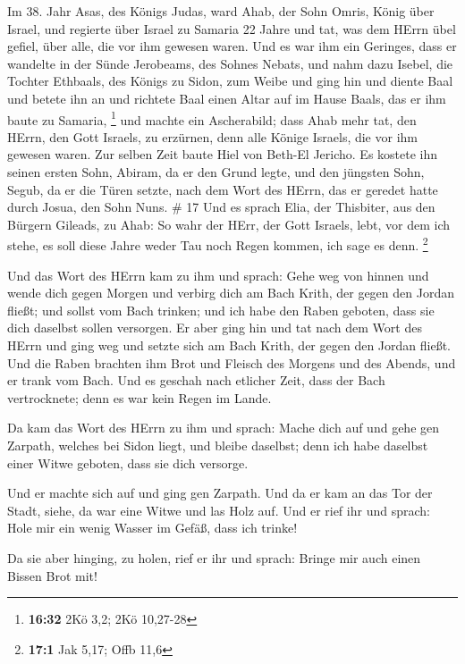  Im 38. Jahr Asas, des Königs Judas, ward Ahab, der Sohn
Omris, König über Israel, und regierte über Israel zu Samaria 22 Jahre
 und tat, was dem HErrn übel gefiel, über alle, die vor ihm
gewesen waren.  Und es war ihm ein Geringes, dass er
wandelte in der Sünde Jerobeams, des Sohnes Nebats, und nahm dazu
Isebel, die Tochter Ethbaals, des Königs zu Sidon, zum Weibe und ging
hin und diente Baal und betete ihn an  und richtete Baal
einen Altar auf im Hause Baals, das er ihm baute zu Samaria, \footnote{\textbf{16:32}
  2Kö 3,2; 2Kö 10,27-28}  und machte ein Ascherabild; dass
Ahab mehr tat, den HErrn, den Gott Israels, zu erzürnen, denn alle
Könige Israels, die vor ihm gewesen waren.  Zur selben Zeit
baute Hiel von Beth-El Jericho. Es kostete ihn seinen ersten Sohn,
Abiram, da er den Grund legte, und den jüngsten Sohn, Segub, da er die
Türen setzte, nach dem Wort des HErrn, das er geredet hatte durch Josua,
den Sohn Nuns. \# 17  Und es sprach Elia, der Thisbiter, aus
den Bürgern Gileads, zu Ahab: So wahr der HErr, der Gott Israels, lebt,
vor dem ich stehe, es soll diese Jahre weder Tau noch Regen kommen, ich
sage es denn. \footnote{\textbf{17:1} Jak 5,17; Offb 11,6}

 Und das Wort des HErrn kam zu ihm und sprach: 
Gehe weg von hinnen und wende dich gegen Morgen und verbirg dich am Bach
Krith, der gegen den Jordan fließt;  und sollst vom Bach
trinken; und ich habe den Raben geboten, dass sie dich daselbst sollen
versorgen.  Er aber ging hin und tat nach dem Wort des HErrn
und ging weg und setzte sich am Bach Krith, der gegen den Jordan fließt.
 Und die Raben brachten ihm Brot und Fleisch des Morgens und
des Abends, und er trank vom Bach.  Und es geschah nach
etlicher Zeit, dass der Bach vertrocknete; denn es war kein Regen im
Lande.

 Da kam das Wort des HErrn zu ihm und sprach: 
Mache dich auf und gehe gen Zarpath, welches bei Sidon liegt, und bleibe
daselbst; denn ich habe daselbst einer Witwe geboten, dass sie dich
versorge.

 Und er machte sich auf und ging gen Zarpath. Und da er kam
an das Tor der Stadt, siehe, da war eine Witwe und las Holz auf. Und er
rief ihr und sprach: Hole mir ein wenig Wasser im Gefäß, dass ich
trinke!

 Da sie aber hinging, zu holen, rief er ihr und sprach:
Bringe mir auch einen Bissen Brot mit!

